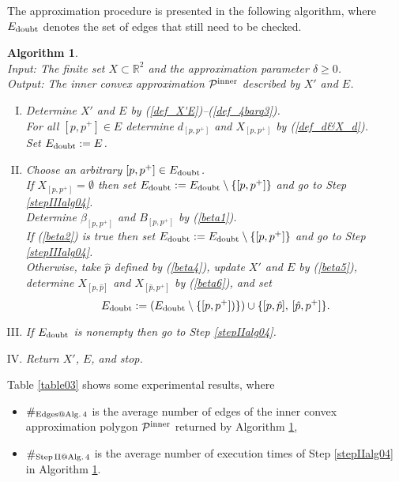 \documentclass[12pt]{article}
\newtheorem{algorithm}{Algorithm}
\def\R{\mathbb{R}}
\begin{document}
The approximation procedure is presented in the following algorithm, where $E_{\rm doubt}$ denotes the set of edges that still need to be checked.

\begin{algorithm}\label{alg04}  \rm \ \\
\emph{Input:} The finite set $X \subset \R^2$ and the approximation parameter $\delta \geq 0$. \\
\emph{Output:} The inner convex approximation ${\cal P}^{\rm inner}$ described by $X'$ and $E$.
\begin{enumerate}[I.]
\item\label{stepIalg04} 
Determine $X'$ and $E$ by (\ref{def_X'E})--(\ref{def_4barq3}).\\
For all $[p, p^+] \in E$ determine $d_{[p, p^+]}$ and $X_{[p, p^+]}$ by (\ref{def_d&X_d}).\\
Set $E_{\rm doubt} := E$.

\item\label{stepIIalg04} 
Choose an arbitrary $[p, p^+] \in E_{\rm doubt}$. \\
If $X_{[p, p^+]} = \emptyset$ then set
$E_{\rm doubt} := E_{\rm doubt} \setminus \{[p, p^+]\}$
and go to Step \ref{stepIIIalg04}.\\
Determine $\beta_{[p, p^+]}$ and $B_{[p, p^+]}$ by (\ref{beta1}). \\
If (\ref{beta2}) is true then set
$E_{\rm doubt} := E_{\rm doubt} \setminus \{[p, p^+]\}$
and go to Step \ref{stepIIIalg04}.\\
Otherwise, take $\hat p$ defined by (\ref{beta4}),
update $X'$ and $E$ by (\ref{beta5}), determine $X_{[p, \hat p]}$ and $X_{[\hat p, p^+]}$ by (\ref{beta6}),
and set
\begin{equation*}%
E_{\rm doubt} := (E_{\rm doubt} \setminus \{[p, p^+])\}) \cup \{[p, \hat p], \, [\hat p, p^+]\}.
\end{equation*}

\item\label{stepIIIalg04} 
If $E_{\rm doubt}$ is nonempty then go to Step \ref{stepIIalg04}.

\item
Return $X'$, $E$, and stop.
\end{enumerate}
\end{algorithm}


\medskip
Table \ref{table03} shows some experimental results, where
\begin{itemize}
\item $\#_{\rm Edges@ Alg.\, 4}$ is the average number of edges of the inner convex approximation polygon ${\cal P}^{\rm inner}$ returned by Algorithm \ref{alg04},
\item $\#_{\rm Step\, II @ Alg.\, 4}$ is the average number of execution times of Step \ref{stepIIalg04} in Algorithm \ref{alg04}.
\end{itemize}
\end{document}
